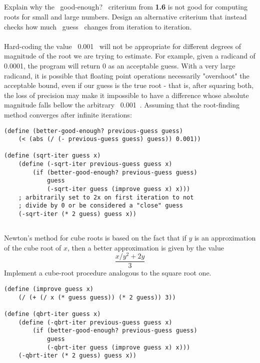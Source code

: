 \documentclass{article}
\begin{document}
\pagebreak
\subsection{}
Explain why the ~good-enough?~ criterium from \textbf{1.6} is not good for computing roots for small and large numbers. Design an alternative criterium that instead checks how much ~guess~ changes from iteration to iteration.\\ \\
Hard-coding the value ~0.001~ will not be appropriate for different degrees of magnitude of the root we are trying to estimate. For example, given a radicand of 0.0001, the program will return 0 as an acceptable guess. With a very large radicand, it is possible that floating point operations necessarily "overshoot" the acceptable bound, even if our guess is the true root - that is, after squaring both, the loss of precision may make it impossible to have a difference whose absolute magnitude falls bellow the arbitrary ~0.001~. Assuming that the root-finding method converges after infinite iterations:
\begin{lstlisting}
(define (better-good-enough? previous-guess guess)
    (< (abs (/ (- previous-guess guess) guess)) 0.001))

(define (sqrt-iter guess x)
    (define (-sqrt-iter previous-guess guess x)
        (if (better-good-enough? previous-guess guess)
            guess
            (-sqrt-iter guess (improve guess x) x)))
    ; arbitrarily set to 2x on first iteration to not
    ; divide by 0 or be considered a "close" guess
    (-sqrt-iter (* 2 guess) guess x))
\end{lstlisting}

\subsection{}
Newton's method for cube roots is based on the fact that if $y$ is an approximation of the cube root of $x$, then a better approximation is given by the value
\[ \frac{x/y^2 + 2y}{3} \]
Implement a cube-root procedure analogous to the square root one.
\begin{lstlisting}
(define (improve guess x)
    (/ (+ (/ x (* guess guess)) (* 2 guess)) 3))

(define (qbrt-iter guess x)
    (define (-qbrt-iter previous-guess guess x)
        (if (better-good-enough? previous-guess guess)
            guess
            (-qbrt-iter guess (improve guess x) x)))
    (-qbrt-iter (* 2 guess) guess x))
\end{lstlisting}
\end{document}
